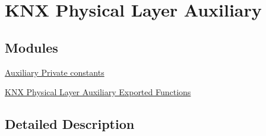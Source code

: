 \hypertarget{group___k_n_x___aux}{}\section{K\+NX Physical Layer Auxiliary}
\label{group___k_n_x___aux}
\subsection*{Modules}
\begin{DoxyCompactItemize}
\item 
\hyperlink{group___k_n_x___aux___private___consts}{Auxiliary Private constants}
\item 
\hyperlink{group___k_n_x___aux___exported___functions}{K\+N\+X Physical Layer Auxiliary Exported Functions}
\end{DoxyCompactItemize}


\subsection{Detailed Description}
